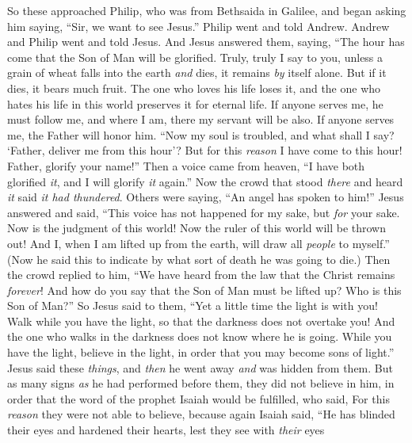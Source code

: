 \begin{biblechapter}
\verse So these approached Philip, who was from Bethsaida in Galilee, and began asking him saying, “Sir, we want to see Jesus.”
\verse Philip went and told Andrew. Andrew and Philip went and told Jesus.
\verse And Jesus answered them, saying, “The hour has come that the Son of Man will be glorified.
\verse Truly, truly I say to you, unless a grain of wheat falls into the earth \textit{and} dies, it remains \textit{by} itself alone. But if it dies, it bears much fruit.
\verse The one who loves his life loses it, and the one who hates his life in this world preserves it for eternal life.
\verse If anyone serves me, he must follow me, and where I am, there my servant will be also. If anyone serves me, the Father will honor him.
 “Now my soul is troubled, and what shall I say? ‘Father, deliver me from this hour’? But for this \textit{reason} I have come to this hour!
\verse Father, glorify your name!” Then a voice came from heaven, “I have both glorified \textit{it}, and I will glorify \textit{it} again.”
\verse Now the crowd that stood \textit{there} and heard \textit{it} said \textit{it had thundered}. Others were saying, “An angel has spoken to him!”
\verse Jesus answered and said, “This voice has not happened for my sake, but \textit{for} your sake.
\verse Now is the judgment of this world! Now the ruler of this world will be thrown out!
\verse And I, when I am lifted up from the earth, will draw all \textit{people} to myself.”
\verse (Now he said this to indicate by what sort of death he was going to die.)
\verse Then the crowd replied to him, “We have heard from the law that the Christ remains \textit{forever}! And how do you say that the Son of Man must be lifted up? Who is this Son of Man?”
\verse So Jesus said to them, “Yet a little time the light is with you! Walk while you have the light, so that the darkness does not overtake you! And the one who walks in the darkness does not know where he is going.
\verse While you have the light, believe in the light, in order that you may become sons of light.” Jesus said these \textit{things}, and \textit{then} he went away \textit{and} was hidden from them.
 But as many signs \textit{as} he had performed before them, they did not believe in him,
\verse in order that the word of the prophet Isaiah would be fulfilled, who said,
\verse For this \textit{reason} they were not able to believe, because again Isaiah said,
\verse “He has blinded their eyes 
and hardened their hearts, 
lest they see with \textit{their} eyes 

\end{biblechapter}
